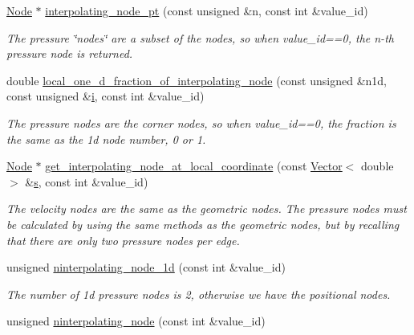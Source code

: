 \begin{DoxyCompactItemize}
\hyperlink{classoomph_1_1Node}{Node} $\ast$ \hyperlink{classoomph_1_1RefineableQPVDElementWithContinuousPressure_a935ead3e5472150fe627587abb12cbf8}{interpolating\+\_\+node\+\_\+pt} (const unsigned \&n, const int \&value\+\_\+id)
\begin{DoxyCompactList}\small\item\em The pressure \char`\"{}nodes\char`\"{} are a subset of the nodes, so when value\+\_\+id==0, the n-\/th pressure node is returned. \end{DoxyCompactList}\item 
double \hyperlink{classoomph_1_1RefineableQPVDElementWithContinuousPressure_a02fc56894e2c1157f6a081ca42954650}{local\+\_\+one\+\_\+d\+\_\+fraction\+\_\+of\+\_\+interpolating\+\_\+node} (const unsigned \&n1d, const unsigned \&\hyperlink{cfortran_8h_adb50e893b86b3e55e751a42eab3cba82}{i}, const int \&value\+\_\+id)
\begin{DoxyCompactList}\small\item\em The pressure nodes are the corner nodes, so when value\+\_\+id==0, the fraction is the same as the 1d node number, 0 or 1. \end{DoxyCompactList}\item 
\hyperlink{classoomph_1_1Node}{Node} $\ast$ \hyperlink{classoomph_1_1RefineableQPVDElementWithContinuousPressure_ac2b58d140461e737e6e013ea26489e0c}{get\+\_\+interpolating\+\_\+node\+\_\+at\+\_\+local\+\_\+coordinate} (const \hyperlink{classoomph_1_1Vector}{Vector}$<$ double $>$ \&\hyperlink{cfortran_8h_ab7123126e4885ef647dd9c6e3807a21c}{s}, const int \&value\+\_\+id)
\begin{DoxyCompactList}\small\item\em The velocity nodes are the same as the geometric nodes. The pressure nodes must be calculated by using the same methods as the geometric nodes, but by recalling that there are only two pressure nodes per edge. \end{DoxyCompactList}\item 
unsigned \hyperlink{classoomph_1_1RefineableQPVDElementWithContinuousPressure_a9b38f35f3251638b00e5b095f0294e07}{ninterpolating\+\_\+node\+\_\+1d} (const int \&value\+\_\+id)
\begin{DoxyCompactList}\small\item\em The number of 1d pressure nodes is 2, otherwise we have the positional nodes. \end{DoxyCompactList}\item 
unsigned \hyperlink{classoomph_1_1RefineableQPVDElementWithContinuousPressure_a376ff088df9caf8cbb9a653e8837987e}{ninterpolating\+\_\+node} (const int \&value\+\_\+id)

\end{DoxyCompactItemize}
